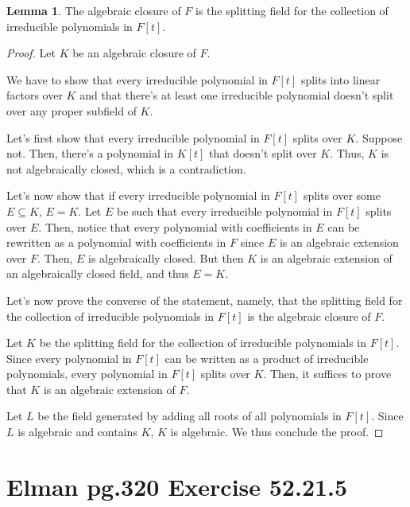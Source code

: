 \documentclass{article}
\theoremstyle{definition}
\newtheorem{lemma}[theorem]{Lemma}
\begin{document}
\begin{lemma}
    The algebraic closure of $F$ is the splitting field for the collection of irreducible
    polynomials in $F[t]$.
\end{lemma}
\begin{proof}
    Let $K$ be an algebraic closure of $F$. 
    
    We have to show that every irreducible polynomial in $F[t]$
    splits into linear factors over $K$ and that there's at least one irreducible
    polynomial doesn't split over any proper subfield of $K$.

    Let's first show that every irreducible polynomial in $F[t]$ splits over $K$.
    Suppose not. Then, there's a polynomial in $K[t]$ that doesn't split over $K$.
    Thus, $K$ is not algebraically closed, which is a contradiction.

    Let's now show that if every irreducible polynomial in $F[t]$ splits
    over some $E \subseteq K$, $E = K$. Let $E$ be such that 
    every irreducible polynomial in $F[t]$ splits over $E$.
    Then, notice that every polynomial with coefficients in $E$ can be rewritten
    as a polynomial with coefficients in $F$ since $E$ is an algebraic extension over $F$.
    Then, $E$ is algebraically closed. But then $K$ is an algebraic extension of an algebraically
    closed field, and thus $E = K$.

    Let's now prove the converse of the statement, namely, that the splitting field
    for the collection of irreducible polynomials in $F[t]$ is the algebraic closure of $F$.
    
    Let $K$ be the splitting field for the collection of irreducible polynomials in $F[t]$.
    Since every polynomial in $F[t]$ can be written as a product of irreducible polynomials,
    every polynomial in $F[t]$ splits over $K$. Then, it suffices to prove that $K$ is
    an algebraic extension of $F$.

    Let $L$ be the field generated by adding all roots of all polynomials in $F[t]$.
    Since $L$ is algebraic and contains $K$, $K$ is algebraic. We thus conclude the proof.
\end{proof}


\newpage

\section{Elman pg.320 Exercise 52.21.5}
\end{document}
